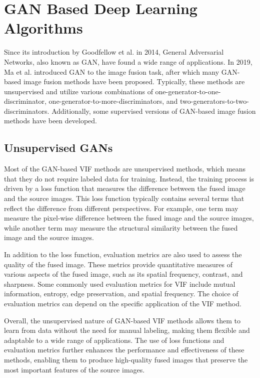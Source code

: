 \section{GAN Based Deep Learning Algorithms}
\label{sec:GAN}

Since its introduction by Goodfellow et al. \cite{goodfellow2014generative} in 2014, General Adversarial Networks, also known as GAN, have found a wide range of applications. In 2019, Ma et al. \cite{ma2019fusiongan} introduced GAN to the image fusion task, after which many GAN-based image fusion methods have been proposed. Typically, these methods are unsupervised and utilize various combinations of one-generator-to-one-discriminator, one-generator-to-more-discriminators, and two-generators-to-two-discriminators. Additionally, some supervised versions of GAN-based image fusion methods have been developed.

\subsection{Unsupervised GANs}
\label{subsec:uGAN}

Most of the GAN-based VIF methods are unsupervised methods, which means that they do not require labeled data for training. Instead, the training process is driven by a loss function that measures the difference between the fused image and the source images. This loss function typically contains several terms that reflect the difference from different perspectives. For example, one term may measure the pixel-wise difference between the fused image and the source images, while another term may measure the structural similarity between the fused image and the source images.

In addition to the loss function, evaluation metrics are also used to assess the quality of the fused image. These metrics provide quantitative measures of various aspects of the fused image, such as its spatial frequency, contrast, and sharpness. Some commonly used evaluation metrics for VIF include mutual information, entropy, edge preservation, and spatial frequency. The choice of evaluation metrics can depend on the specific application of the VIF method.

Overall, the unsupervised nature of GAN-based VIF methods allows them to learn from data without the need for manual labeling, making them flexible and adaptable to a wide range of applications. The use of loss functions and evaluation metrics further enhances the performance and effectiveness of these methods, enabling them to produce high-quality fused images that preserve the most important features of the source images.

